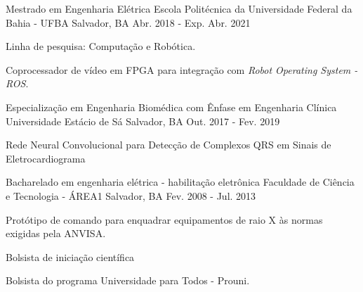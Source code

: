 

\begin{cventries}

  \cventry
    {Mestrado em Engenharia Elétrica} %
    {Escola Politécnica da Universidade Federal da Bahia - UFBA} %
    {Salvador, BA} %
    {Abr. 2018 - Exp. Abr. 2021} %
    {
      \begin{cvitems} %
        \item {Linha de pesquisa: Computação e Robótica.}
        \item {Coprocessador de vídeo em FPGA para integração com \textit{Robot Operating System - ROS}.}
      \end{cvitems}
    }


  \cventry
    {Especialização em Engenharia Biomédica com Ênfase em Engenharia Clínica} %
    {Universidade Estácio de Sá} %
    {Salvador, BA} %
    {Out. 2017 - Fev. 2019} %
    {
      \begin{cvitems} %
        \item {Rede Neural Convolucional para Detecção de Complexos QRS em Sinais de Eletrocardiograma}
      \end{cvitems}
    }


  \cventry
    {Bacharelado em engenharia elétrica - habilitação eletrônica} %
    {Faculdade de Ciência e Tecnologia - ÁREA1} %
    {Salvador, BA} %
    {Fev. 2008 - Jul. 2013} %
    {
      \begin{cvitems} %
        \item {Protótipo de comando para enquadrar equipamentos de raio X às normas exigidas pela ANVISA.}
        \item {Bolsista de iniciação científica}
        \item {Bolsista do programa Universidade para Todos - Prouni.}
      \end{cvitems}
    }


\end{cventries}
